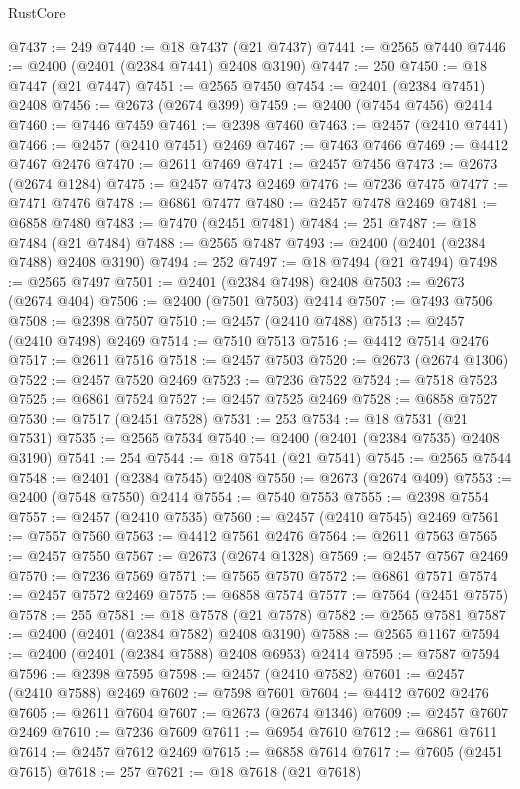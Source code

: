 \begin{lexlean}{RustCore}
\begin{coremodule}
@7437 := 249
@7440 := @18 @7437 (@21 @7437)
@7441 := @2565 @7440
@7446 := @2400 (@2401 (@2384 @7441) @2408 @3190)
@7447 := 250
@7450 := @18 @7447 (@21 @7447)
@7451 := @2565 @7450
@7454 := @2401 (@2384 @7451) @2408
@7456 := @2673 (@2674 @399)
@7459 := @2400 (@7454 @7456) @2414
@7460 := @7446 @7459
@7461 := @2398 @7460
@7463 := @2457 (@2410 @7441)
@7466 := @2457 (@2410 @7451) @2469
@7467 := @7463 @7466
@7469 := @4412 @7467 @2476
@7470 := @2611 @7469
@7471 := @2457 @7456
@7473 := @2673 (@2674 @1284)
@7475 := @2457 @7473 @2469
@7476 := @7236 @7475
@7477 := @7471 @7476
@7478 := @6861 @7477
@7480 := @2457 @7478 @2469
@7481 := @6858 @7480
@7483 := @7470 (@2451 @7481)
@7484 := 251
@7487 := @18 @7484 (@21 @7484)
@7488 := @2565 @7487
@7493 := @2400 (@2401 (@2384 @7488) @2408 @3190)
@7494 := 252
@7497 := @18 @7494 (@21 @7494)
@7498 := @2565 @7497
@7501 := @2401 (@2384 @7498) @2408
@7503 := @2673 (@2674 @404)
@7506 := @2400 (@7501 @7503) @2414
@7507 := @7493 @7506
@7508 := @2398 @7507
@7510 := @2457 (@2410 @7488)
@7513 := @2457 (@2410 @7498) @2469
@7514 := @7510 @7513
@7516 := @4412 @7514 @2476
@7517 := @2611 @7516
@7518 := @2457 @7503
@7520 := @2673 (@2674 @1306)
@7522 := @2457 @7520 @2469
@7523 := @7236 @7522
@7524 := @7518 @7523
@7525 := @6861 @7524
@7527 := @2457 @7525 @2469
@7528 := @6858 @7527
@7530 := @7517 (@2451 @7528)
@7531 := 253
@7534 := @18 @7531 (@21 @7531)
@7535 := @2565 @7534
@7540 := @2400 (@2401 (@2384 @7535) @2408 @3190)
@7541 := 254
@7544 := @18 @7541 (@21 @7541)
@7545 := @2565 @7544
@7548 := @2401 (@2384 @7545) @2408
@7550 := @2673 (@2674 @409)
@7553 := @2400 (@7548 @7550) @2414
@7554 := @7540 @7553
@7555 := @2398 @7554
@7557 := @2457 (@2410 @7535)
@7560 := @2457 (@2410 @7545) @2469
@7561 := @7557 @7560
@7563 := @4412 @7561 @2476
@7564 := @2611 @7563
@7565 := @2457 @7550
@7567 := @2673 (@2674 @1328)
@7569 := @2457 @7567 @2469
@7570 := @7236 @7569
@7571 := @7565 @7570
@7572 := @6861 @7571
@7574 := @2457 @7572 @2469
@7575 := @6858 @7574
@7577 := @7564 (@2451 @7575)
@7578 := 255
@7581 := @18 @7578 (@21 @7578)
@7582 := @2565 @7581
@7587 := @2400 (@2401 (@2384 @7582) @2408 @3190)
@7588 := @2565 @1167
@7594 := @2400 (@2401 (@2384 @7588) @2408 @6953) @2414
@7595 := @7587 @7594
@7596 := @2398 @7595
@7598 := @2457 (@2410 @7582)
@7601 := @2457 (@2410 @7588) @2469
@7602 := @7598 @7601
@7604 := @4412 @7602 @2476
@7605 := @2611 @7604
@7607 := @2673 (@2674 @1346)
@7609 := @2457 @7607 @2469
@7610 := @7236 @7609
@7611 := @6954 @7610
@7612 := @6861 @7611
@7614 := @2457 @7612 @2469
@7615 := @6858 @7614
@7617 := @7605 (@2451 @7615)
@7618 := 257
@7621 := @18 @7618 (@21 @7618)

\end{coremodule}
\end{lexlean}
